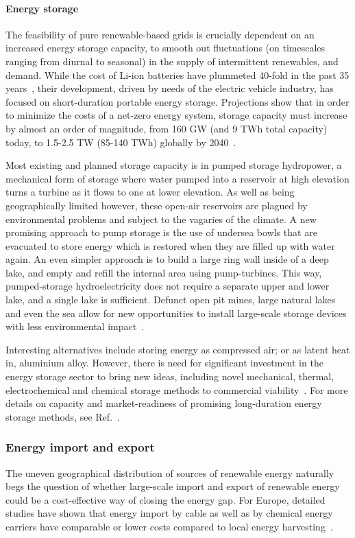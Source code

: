 \documentclass[../SustainableHEP.tex]{subfiles}
\begin{document}
\paragraph{Energy storage}
The feasibility of pure renewable-based grids is crucially dependent on an increased energy storage capacity, to smooth out fluctuations (on timescales ranging from diurnal to seasonal) in the supply of intermittent renewables, and demand.  While the cost of Li-ion batteries have plummeted 40-fold in the past 35 years~\cite{Ziegler_2020}, their development, driven by needs of the electric vehicle industry, has focused on short-duration portable energy storage.  Projections show that in order to minimize the costs of a net-zero energy system, storage capacity must increase by almost an order of magnitude, from 160 GW (and 9 TWh total capacity) today, to 1.5-2.5 TW (85-140 TWh) globally  by 2040~\cite{LDESEnergyStorage}.  

Most existing and planned storage capacity is in pumped storage hydropower, a mechanical form of storage where water pumped into a reservoir at high elevation turns a turbine as it flows to one at lower elevation.  As well as being geographically limited however, these open-air reservoirs are plagued by environmental problems and subject to the vagaries of the climate. 
A new promising approach to pump storage is the use of undersea bowls that are evacuated to store energy which is restored when they are filled up with water again. An even simpler approach is to build a large ring wall inside of a deep lake, and empty and refill the internal area using pump-turbines. This way, pumped-storage hydroelectricity does not require a separate upper and lower lake, and a single lake is sufficient.
Defunct open pit mines, large natural lakes and even the sea allow for new opportunities to install large-scale storage devices with less environmental impact~\cite{Dueren,pumpstorage}.  

Interesting alternatives include storing energy as compressed air; or as latent heat in, \eg aluminium alloy.
However, there is need for significant investment in the energy storage sector to bring new ideas, including novel mechanical, thermal, electrochemical and chemical storage methods to commercial viability~\cite{LDESEnergyStorage}.    For more details on capacity and market-readiness of promising long-duration energy storage methods, see Ref.~\cite{LDESEnergyStorage}.

\subsubsection{Energy import and export}
\label{subsec:import}
The uneven geographical distribution of sources of renewable energy naturally begs the question of whether large-scale import and export of renewable energy could be a cost-effective way of closing the energy gap. For Europe, detailed studies have shown that energy import by cable as well as by chemical energy carriers have comparable or lower costs compared to local energy harvesting~\cite{10.1371/journal.pone.0281380}.
\end{document}
